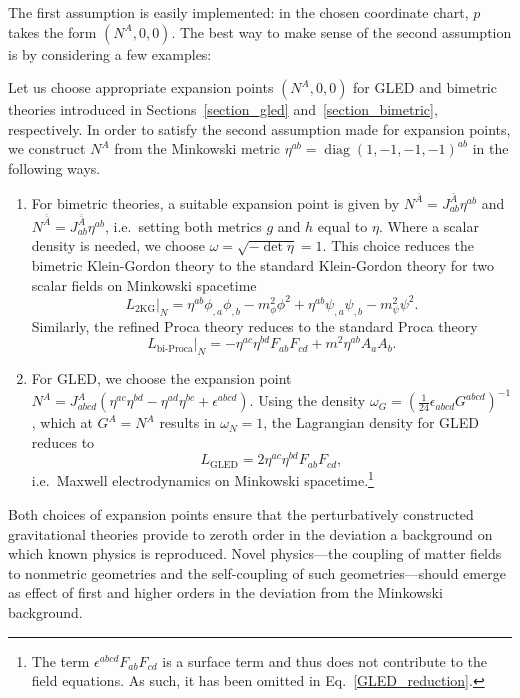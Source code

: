 The first assumption is easily implemented: in the chosen coordinate chart, $p$ takes the form $(N^A,0,0)$. The best way to make sense of the second assumption is by considering a few examples:
\begin{example}\label{example_expansion_points}
  Let us choose appropriate expansion points $(N^A,0,0)$ for GLED and bimetric theories introduced in Sections~\ref{section_gled} and~\ref{section_bimetric}, respectively. In order to satisfy the second assumption made for expansion points, we construct $N^A$ from the Minkowski metric $\eta^{ab} = \operatorname{diag}(1,-1,-1,-1)^{ab}$ in the following ways.
  \begin{enumerate}
    \item{For bimetric theories, a suitable expansion point is given by $N^{\bar A} = J_{ab}^{\bar A} \eta^{ab}$ and $N^{\bar{\bar A}} = J_{ab}^{\bar{\bar A}} \eta^{ab}$, i.e.\ setting both metrics $g$ and $h$ equal to $\eta$. Where a scalar density is needed, we choose $\omega = \sqrt{-\operatorname{det}\eta} = 1$. This choice reduces the bimetric Klein-Gordon theory to the standard Klein-Gordon theory for two scalar fields on Minkowski spacetime
      \begin{equation}
        L_\text{2KG}\big\rvert_N = \eta^{ab} \phi_{,a} \phi_{,b} - m_\phi^2\phi^2 + \eta^{ab} \psi_{,a} \psi_{,b} - m_\psi^2\psi^2.
      \end{equation}
    Similarly, the refined Proca theory reduces to the standard Proca theory
      \begin{equation}
        L_\text{bi-Proca}\big\rvert_N = -\eta^{ac}\eta^{bd}F_{ab}F_{cd} + m^2\eta^{ab}A_aA_b.
      \end{equation}}
    \item{For GLED, we choose the expansion point $N^A = J_{abcd}^A (\eta^{ac} \eta^{bd} - \eta^{ad} \eta^{bc} + \epsilon^{abcd})$. Using the density $\omega_G = (\frac{1}{24}\epsilon_{abcd}G^{abcd})^{-1}$, which at $G^A=N^A$ results in $\omega_N = 1$, the Lagrangian density for GLED reduces to
        \begin{equation}\label{GLED_reduction}
        L_\text{GLED} = 2 \eta^{ac}\eta^{bd} F_{ab}F_{cd},
      \end{equation}
    i.e.\ Maxwell electrodynamics on Minkowski spacetime.\footnote{The term $\epsilon^{abcd}F_{ab}F_{cd}$ is a surface term and thus does not contribute to the field equations. As such, it has been omitted in Eq.~\ref{GLED_reduction}.}}
  \end{enumerate}
\end{example}
Both choices of expansion points ensure that the perturbatively constructed gravitational theories provide to zeroth order in the deviation a background on which known physics is reproduced. Novel physics---the coupling of matter fields to nonmetric geometries and the self-coupling of such geometries---should emerge as effect of first and higher orders in the deviation from the Minkowski background.

